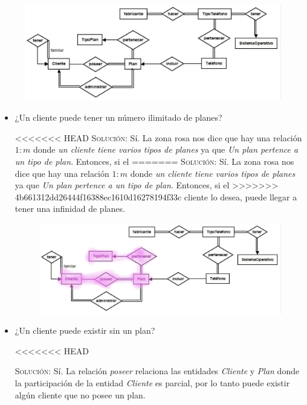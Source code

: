 \documentclass[letterpaper,11pt]{article}
\begin{document}
    \begin{figure}[h]
        \centering
        \includegraphics[scale=0.4]{./imagenes/modelo.jpg}
    \end{figure}

    \begin{itemize}
        \item ¿Un cliente puede tener un número ilimitado de planes?


<<<<<<< HEAD
    \textsc{Solución:} Sí. La zona rosa nos dice que hay una relación $1:m$
    donde \textit{un cliente tiene varios tipos de planes} ya que
    \textit{Un plan pertence a un tipo de plan}. Entonces, si el
=======
    \textsc{Solución:} Sí. La zona rosa nos dice que hay una relación $1:m$ 
    donde \textit{un cliente tiene varios tipos de planes} ya que 
    \textit{Un plan pertence a un tipo de plan}. Entonces, si el 
>>>>>>> 4b661312dd26444f16388ec1610d16278194f33c
    cliente lo desea, puede llegar a tener una infinidad de planes.

    \begin{figure}[h]
        \centering
        \includegraphics[scale=0.4]{./imagenes/modelo1.jpg}
    \end{figure}

    \item ¿Un cliente puede existir sin un plan?

<<<<<<< HEAD

    \textsc{Solución:} Sí. La relación \textit{poseer} relaciona las entidades \textit{Cliente} y \textit{Plan} donde la participación de la entidad \textit{Cliente} es parcial, por lo tanto puede existir algún cliente que no posee un plan.


\end{itemize}
\end{document}
